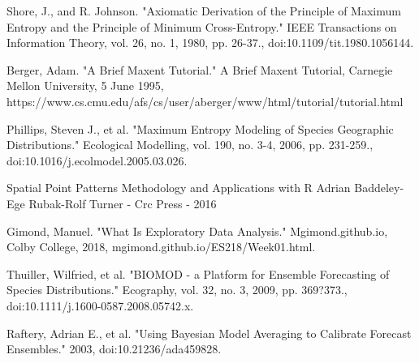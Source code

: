 \noindent [10]  Shore, J., and R. Johnson. 
"Axiomatic Derivation of the Principle of Maximum Entropy and the Principle of Minimum Cross-Entropy." 
IEEE Transactions on Information Theory, vol. 26, no. 1, 1980, pp. 26-37.,
doi:10.1109/tit.1980.1056144. \newline

\noindent [11] Berger, Adam. "A Brief Maxent Tutorial." A Brief Maxent Tutorial, \newline Carnegie Mellon University, 5 June 1995, \newline 
https://www.cs.cmu.edu/afs/cs/user/aberger/www/html/tutorial/tutorial.html\newline

\noindent [12] Phillips, Steven J., et al. 
"Maximum Entropy Modeling of Species Geographic Distributions."
Ecological Modelling, vol. 190, no. 3-4, 2006, pp. 231-259.,\newline
doi:10.1016/j.ecolmodel.2005.03.026. \newline

\noindent[13] Spatial Point Patterns Methodology and Applications with R
Adrian Baddeley-Ege Rubak-Rolf Turner - Crc Press - 2016 \newline

\noindent [14] Gimond, Manuel. "What Is Exploratory Data Analysis." Mgimond.github.io, \newline Colby College, 2018, mgimond.github.io/ES218/Week01.html. \newline

\noindent [15] Thuiller, Wilfried, et al. "BIOMOD - a Platform for Ensemble Forecasting 
of Species Distributions." Ecography, vol. 32, no. 3, 2009, pp. 369?373.,
doi:10.1111/j.1600-0587.2008.05742.x. \newline
 
 \noindent [16] Raftery, Adrian E., et al. 
"Using Bayesian Model Averaging to Calibrate Forecast Ensembles." 2003,
 doi:10.21236/ada459828.
 
 
 
 